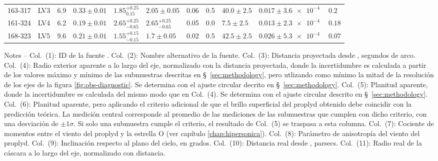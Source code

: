\begin{landscape}
\begin{table}
\begin{adjustbox}{width=1.35\textwidth}
\begin{tabular}{llrllllrlll}
  163-317  & LV3      &   6.9  &  $0.33 \pm 0.01$  &  $1.85^{+0.25}_{0.15}$   &  $2.05 \pm 0.05$     &  0.06  &  0.5  &  $40.0 \pm 2.5$   &  $0.017 \pm \SI{3.6e-4}{}$  &  $0.2$  \\
 161-324  & LV4      &   6.2  &  $0.19 \pm 0.01$  &  $2.65^{+0.25}_{-0.65}$   &  $2.65^{+0.25}_{-0.65}$     &  0.05  &  0.0  &  $7.5 \pm 2.5$  &  $0.013 \pm \SI{2.3e-4}{}$  &  $0.18$  \\
 168-323  & LV5      &   9.6  &  $0.21 \pm 0.01$  &  $1.55^{+0.15}_{-0.15}$   &  $1.7 \pm 0.05$     &  0.02  &  0.5  &  $42.5 \pm 2.5$   &  $0.026 \pm \SI{5.3e-4}{}$  &  $0.07$  \\
\bottomrule
\end{tabular}
\end{adjustbox}
\begin{minipage}{0.95\linewidth}
\footnotesize
  Notes --
%
  Col.~(1): ID de la fuente \citep{ODell:1994a}.
%
  Col.~(2): Nombre alternativo de la fuente.
% 
  Col.~(3): Distancia proyectada desde \thC{}, segundos de arco.
%
  Col.~(4): Radio exterior aparente a lo largo del eje, normalizado con la distancia proyectada, donde la incertidumbre es calculada a partir de los valores máximo y mínimo de las submuestras descritas en \S~\ref{sec:methodology}, pero utlizando como mínimo la mitad de la resolución de los ejes de la figura \ref{fig:obs-diagnostic}. Se determina con el ajuste circular decrito en \S~\ref{sec:methodology}.
% 
  Col.~(5): Planitud aparente, donde la incertidumbre es calculada del mismo modo que en Col.~(4). Se determina con el ajuste circular descrito en \S~\ref{sec:methodology}.
% 
  Col.~(6): Planitud aparente, pero aplicando el criterio adicional de que el brillo superficial del proplyd obtenido debe coincidir con la predicción teórica. La medición central corresponde al promedio de las mediciones de las submuestras que cumplen con dicho criterio, con una desviación de $\pm 1\sigma$. Si solo una submuestra cumple el criterio, el resultado de Col.~(5) se traspasa a esta columna. 
%
  Col.~(7): Cociente de momentos entre el viento del proplyd y la estrella O (ver capítulo \ref{chap:hipersonica}). 
% 
  Col.~(8): Parámetro de anisotropía del viento del proplyd.
% 
  Col.~(9): Inclinación respecto al plano del cielo, en grados.
% 
  Col.~(10): Distancia real desde \thC{}, parsecs.
%
  Col.~(11): Radio real de la cáscara a lo largo del eje, normalizado con distancia.

\end{minipage}
\end{table}
\end{landscape}